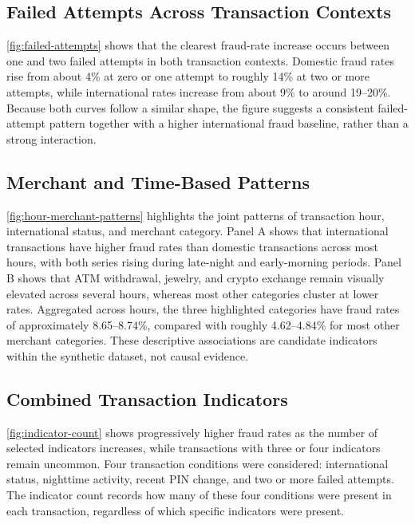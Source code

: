 \documentclass[conference,final,]{IEEEtran}
\begin{document}
\subsection{Failed Attempts Across Transaction
Contexts}\label{failed-attempts-across-transaction-contexts}

\autoref{fig:failed-attempts} shows that the clearest fraud-rate
increase occurs between one and two failed attempts in both transaction
contexts. Domestic fraud rates rise from about 4\% at zero or one
attempt to roughly 14\% at two or more attempts, while international
rates increase from about 9\% to around 19--20\%. Because both curves
follow a similar shape, the figure suggests a consistent failed-attempt
pattern together with a higher international fraud baseline, rather than
a strong interaction.

\subsection{Merchant and Time-Based
Patterns}\label{merchant-and-time-based-patterns}

\autoref{fig:hour-merchant-patterns} highlights the joint patterns of
transaction hour, international status, and merchant category. Panel A
shows that international transactions have higher fraud rates than
domestic transactions across most hours, with both series rising during
late-night and early-morning periods. Panel B shows that ATM withdrawal,
jewelry, and crypto exchange remain visually elevated across several
hours, whereas most other categories cluster at lower rates. Aggregated
across hours, the three highlighted categories have fraud rates of
approximately 8.65--8.74\%, compared with roughly 4.62--4.84\% for most
other merchant categories. These descriptive associations are candidate
indicators within the synthetic dataset, not causal evidence.

\subsection{Combined Transaction
Indicators}\label{combined-transaction-indicators}

\autoref{fig:indicator-count} shows progressively higher fraud rates as
the number of selected indicators increases, while transactions with
three or four indicators remain uncommon. Four transaction conditions
were considered: international status, nighttime activity, recent PIN
change, and two or more failed attempts. The indicator count records how
many of these four conditions were present in each transaction,
regardless of which specific indicators were present.
\end{document}

